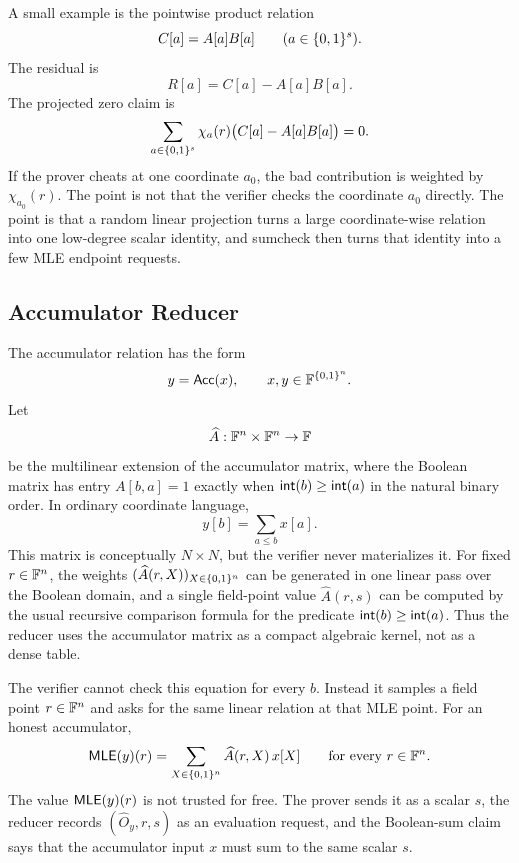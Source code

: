 A small example is the pointwise product relation
\[
  C[a]=A[a]B[a]\qquad(a\in\{0,1\}^s).
\]
The residual is
\[
  R[a]=C[a]-A[a]B[a].
\]
The projected zero claim is
\[
  \sum_{a\in\{0,1\}^s}\chi_a(r)\bigl(C[a]-A[a]B[a]\bigr)=0.
\]
If the prover cheats at one coordinate \(a_0\), the bad contribution is weighted
by \(\chi_{a_0}(r)\).  The point is not that the verifier checks the coordinate
\(a_0\) directly.  The point is that a random linear projection turns a large
coordinate-wise relation into one low-degree scalar identity, and sumcheck then
turns that identity into a few MLE endpoint requests.

\subsection{Accumulator Reducer}

The accumulator relation has the form
\[
  y=\mathsf{Acc}(x),
  \qquad
  x,y\in\mathbb{F}^{\{0,1\}^n}.
\]
Let
\[
  \widehat A:\mathbb{F}^n\times\mathbb{F}^n\to\mathbb{F}
\]
be the multilinear extension of the accumulator matrix, where the Boolean
matrix has entry \(A[b,a]=1\) exactly when \(\mathsf{int}(b)\ge \mathsf{int}(a)\) in the
natural binary order.  In ordinary coordinate language,
\[
  y[b]=\sum_{a\le b}x[a].
\]
This matrix is conceptually \(N\times N\), but the verifier never materializes
it.  For fixed \(r\in\mathbb{F}^n\), the weights
\((\widehat A(r,X))_{X\in\{0,1\}^n}\) can be generated in one linear pass over the
Boolean domain, and a single field-point value
\(\widehat A(r,s)\) can be computed by the usual recursive comparison formula
for the predicate \(\mathsf{int}(b)\ge\mathsf{int}(a)\).  Thus the reducer uses the
accumulator matrix as a compact algebraic kernel, not as a dense table.

The verifier cannot check this equation for every \(b\).  Instead it samples a
field point \(r\in\mathbb{F}^n\) and asks for the same linear relation at that MLE
point.  For an honest accumulator,
\[
  \mathsf{MLE}(y)(r)
  =
  \sum_{X\in\{0,1\}^n}\widehat A(r,X)\,x[X]
  \qquad
  \text{for every }r\in\mathbb{F}^n.
\]
The value \(\mathsf{MLE}(y)(r)\) is not trusted for free.  The prover sends it as a
scalar \(s\), the reducer records \((\widehat O_y,r,s)\) as an evaluation request,
and the Boolean-sum claim says that the accumulator input \(x\) must sum to the
same scalar \(s\).

